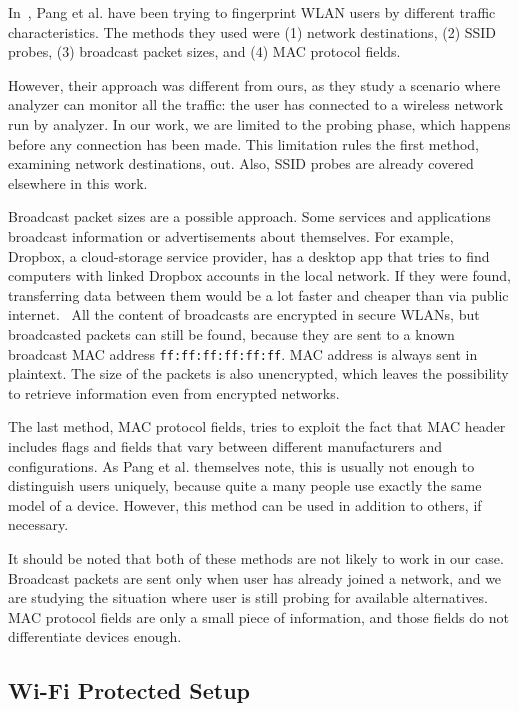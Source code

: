 \documentclass[12pt,a4paper,oneside,pdftex]{report}
\begin{document}
In~\cite{pang2007802}, Pang et al. have been trying to fingerprint WLAN users by different traffic characteristics. The methods they used were (1) network destinations, (2) SSID probes, (3) broadcast packet sizes, and (4) MAC protocol fields. 

However, their approach was different from ours, as they study a scenario where analyzer can monitor all the traffic: the user has connected to a wireless network run by analyzer. In our work, we are limited to the probing phase, which happens before any connection has been made. This limitation rules the first method, examining network destinations, out. Also, SSID probes are already covered elsewhere in this work.

Broadcast packet sizes are a possible approach. Some services and applications broadcast information or advertisements about themselves. For example, Dropbox, a cloud-storage service provider, has a desktop app that tries to find computers with linked Dropbox accounts in the local network. If they were found, transferring data between them would be a lot faster and cheaper than via public internet.~\cite{dropboxlan} All the content of broadcasts are encrypted in secure WLANs, but broadcasted packets can still be found, because they are sent to a known broadcast MAC address \texttt{ff:ff:ff:ff:ff:ff}. MAC address is always sent in plaintext. The size of the packets is also unencrypted, which leaves the possibility to retrieve information even from encrypted networks.

The last method, MAC protocol fields, tries to exploit the fact that MAC header includes flags and fields that vary between different manufacturers and configurations. As Pang et al. themselves note, this is usually not enough to distinguish users uniquely, because quite a many people use exactly the same model of a device. However, this method can be used in addition to others, if necessary.

It should be noted that both of these methods are not likely to work in our case. Broadcast packets are sent only when user has already joined a network, and we are studying the situation where user is still probing for available alternatives. MAC protocol fields are only a small piece of information, and those fields do not differentiate devices enough.

\subsection{Wi-Fi Protected Setup}
\label{sec:wps}
\end{document}
